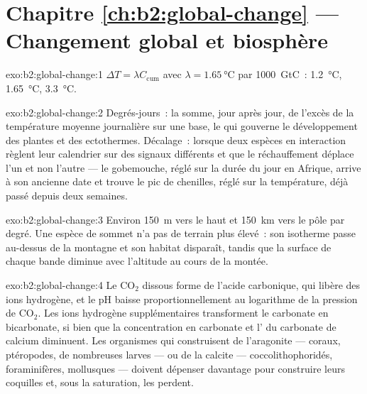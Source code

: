 \section*{Chapitre \ref{ch:b2:global-change} --- Changement global et biosphère}

\begin{solution}{exo:b2:global-change:1}
$\Delta T = \lambda C_{\text{cum}}$ avec $\lambda = \qty{1.65}{\celsius}$
par \qty{1000}{GtC}~: \qty{1.2}{\celsius}, \qty{1.65}{\celsius},
\qty{3.3}{\celsius}.
\end{solution}

\begin{solution}{exo:b2:global-change:2}
Degrés-jours~: la somme, jour après jour, de l'excès de la température
moyenne journalière sur une base, le  qui gouverne le
développement des plantes et des ectothermes. Décalage~: lorsque deux
espèces en interaction règlent leur calendrier sur des signaux différents
et que le réchauffement déplace l'un et non l'autre --- le gobemouche,
réglé sur la durée du jour en Afrique, arrive à son ancienne date et
trouve le pic de chenilles, réglé sur la température, déjà passé depuis
deux semaines.
\end{solution}

\begin{solution}{exo:b2:global-change:3}
Environ \qty{150}{m} vers le haut et \qty{150}{km} vers le pôle par
degré. Une espèce de sommet n'a pas de terrain plus élevé~: son isotherme
passe au-dessus de la montagne et son habitat disparaît, tandis que la
surface de chaque bande diminue avec l'altitude au cours de la montée.
\end{solution}

\begin{solution}{exo:b2:global-change:4}
Le \ensuremath{\mathrm{CO_2}} dissous forme de l'acide carbonique, qui
libère des ions hydrogène, et le pH baisse proportionnellement au
logarithme de la pression de \ensuremath{\mathrm{CO_2}}. Les ions hydrogène
supplémentaires transforment le carbonate en bicarbonate, si bien que la
concentration en carbonate et l' du carbonate de
calcium diminuent. Les organismes qui construisent de l'aragonite ---
coraux, ptéropodes, de nombreuses larves --- ou de la calcite ---
coccolithophoridés, foraminifères, mollusques --- doivent dépenser
davantage pour construire leurs coquilles et, sous la saturation, les
perdent.
\end{solution}


